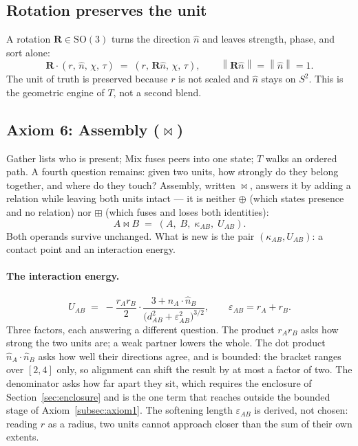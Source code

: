 \documentclass[12pt, a4paper]{article}
\providecommand{\norm}[1]{\left\lVert#1\right\rVert}
\begin{document}
\subsection{Rotation preserves the unit}
\label{subsec:axiom_rotation}
A rotation $\mathbf{R} \in \mathrm{SO}(3)$ turns the direction $\hat n$ and leaves strength, phase, and sort alone:
\begin{equation}
    \mathbf{R}\cdot(r,\,\hat n,\,\chi,\,\tau)
    \;=\;
    (r,\,\mathbf{R}\hat n,\,\chi,\,\tau),
    \qquad
    \norm{\mathbf{R}\hat n} = \norm{\hat n} = 1.
\end{equation}
The unit of truth is preserved because $r$ is not scaled and $\hat n$ stays on $S^2$. This is the geometric engine of $T$, not a second blend.

\subsection{Axiom 6: Assembly (\texorpdfstring{$\bowtie$}{assembly})}
\label{subsec:axiom_assembly}
Gather lists who is present; Mix fuses peers into one state; $T$
walks an ordered path. A fourth question remains: given two units,
how strongly do they belong together, and where do they touch?
Assembly, written $\bowtie$, answers it by adding a relation while
leaving both units intact --- it is neither $\oplus$ (which states
presence and no relation) nor $\boxplus$ (which fuses and loses both
identities):
\begin{equation}
    A \bowtie B \;=\; (A,\;B,\;\kappa_{AB},\;U_{AB}).
    \label{eq:assembly_signature}
\end{equation}
Both operands survive unchanged. What is new is the pair
$(\kappa_{AB}, U_{AB})$: a contact point and an interaction energy.

\paragraph{The interaction energy.}
\begin{equation}
    U_{AB} \;=\; -\frac{r_A r_B}{2}\cdot
    \frac{3+\hat n_A\cdot\hat n_B}
         {\bigl(d_{AB}^2+\varepsilon_{AB}^2\bigr)^{3/2}},
    \qquad
    \varepsilon_{AB} = r_A + r_B.
    \label{eq:assembly_energy}
\end{equation}
Three factors, each answering a different question. The product
$r_Ar_B$ asks how strong the two units are; a weak partner lowers the
whole. The dot product $\hat n_A\cdot\hat n_B$ asks how well their
directions agree, and is bounded: the bracket ranges over $[2,4]$
only, so alignment can shift the result by at most a factor of two.
The denominator asks how far apart they sit, which requires the
enclosure of Section~\ref{sec:enclosure} and is the one term that
reaches outside the bounded stage of Axiom~\ref{subsec:axiom1}. The
softening length $\varepsilon_{AB}$ is derived, not chosen: reading
$r$ as a radius, two units cannot approach closer than the sum of
their own extents.
\end{document}
